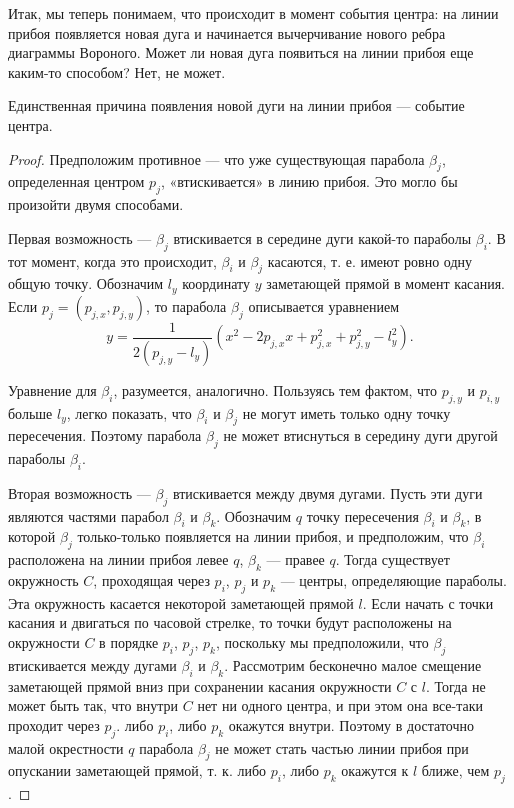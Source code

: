Итак,  мы  теперь  понимаем,  что  происходит  в  момент  события  центра:  на  линии  прибоя  появляется  новая  дуга  и  начинается  вычерчивание  нового  ребра  диаграммы  Вороного. 
Может  ли  новая  дуга  появиться  на  линии  прибоя  еще  каким-то способом? 
Нет,  не  может.

\begin{lemma}
    Единственная  причина  появления  новой  дуги  на  линии  прибоя  ---  событие  центра.
\end{lemma}
\begin{proof}
    Предположим  противное  ---  что  уже существующая  парабола  $\beta_j$,  определенная  центром  $p_j$, «втискивается»  в линию  прибоя. 
    Это  могло  бы  произойти  двумя  способами.

    Первая  возможность  --- $\beta_j$  втискивается  в  середине дуги  какой-то  параболы $\beta_i$.
    В  тот  момент,  когда  это  происходит, $\beta_i$  и  $\beta_j$  касаются,  т.  е.  имеют  ровно  одну  общую  точку.
    Обозначим  $l_y$  координату  $y$  заметающей  прямой  в  момент  касания.
    Если $p_j = (p_{j,x}, p_{j,y})$,  то  парабола $\beta_j$ описывается  уравнением $$y = \frac{1}{2 (p_{j,y} - l_y)} (x^2 - 2 p_{j,x} x + p_{j,x}^2 + p_{j,y}^2 - l_y^2).$$

    Уравнение  для $\beta_i$,  разумеется,  аналогично.
    Пользуясь тем  фактом,  что $p_{j,y}$ и $p_{i,y}$ больше $l_y$,  легко  показать,  что $\beta_i$ и $\beta_j$ не  могут  иметь  только  одну  точку  пересечения.
    Поэтому  парабола $\beta_j$  не  может  втиснуться  в  середину  дуги другой  параболы $\beta_i$.

    Вторая  возможность  --- $\beta_j$  втискивается  между  двумя  дугами.
    Пусть  эти  дуги  являются  частями  парабол $\beta_i$  и  $\beta_k$.  Обозначим  $q$  точку  пересечения  $\beta_i$ и  $\beta_k$,  в  которой $\beta_j$ только-только  появляется  на  линии  прибоя,  и  предположим,  что  $\beta_i$  расположена на  линии  прибоя  левее  $q$,  $\beta_k$  ---  правее  $q$.
    Тогда  существует  окружность  $C$,  проходящая  через  $p_i$, $p_j$  и  $p_k$ ---  центры,  определяющие  параболы.
    Эта  окружность  касается  некоторой  заметающей  прямой  $l$.
    Если  начать  с  точки  касания  и двигаться  по  часовой  стрелке,  то  точки  будут  расположены  на  окружности  $C$  в порядке $p_i$, $p_j$,  $p_k$,  поскольку  мы  предположили,  что $\beta_j$  втискивается  между  дугами  $\beta_i$  и  $\beta_k$.
    Рассмотрим  бесконечно  малое  смещение  заметающей  прямой  вниз  при  сохранении  касания  окружности  $C$  с  $l$.
    Тогда  не  может  быть  так,  что  внутри $C$  нет  ни  одного  центра,  и  при  этом  она  все-таки  проходит  через $p_j$.  либо $p_i$,  либо $p_k$ окажутся  внутри.  
    Поэтому  в  достаточно  малой  окрестности  $q$  парабола $\beta_j$  не  может стать  частью  линии  прибоя  при  опускании  заметающей  прямой,  т.  к.  либо  $p_i$,  либо $p_k$ окажутся  к $l$ ближе, чем $p_j$.
\end{proof}

